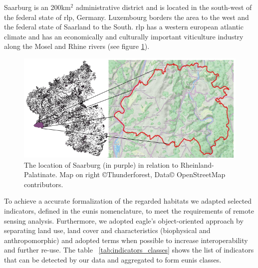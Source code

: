 \documentclass[authoryear,preprint,12pt,number]{elsarticle}
\begin{document}
Saarburg is an 200km$^{2}$ administrative district and is located in the
south-west of the federal state of \gls{rlp}, Germany.
Luxembourg borders the area to the west and the federal state of Saarland to
the South. \gls{rlp} has a western european atlantic climate and has an 
economically
and culturally important viticulture industry along the Mosel and Rhine rivers
(see figure \ref{fig:study_area}).
\begin{figure}
    \includegraphics[width=\textwidth]{diagrams/study_area_closeup.png}
    \caption{The location of Saarburg (in purple) in relation to
    Rheinland-Palatinate. Map on right \copyright Thunderforest, Data\copyright
    OpenStreetMap contributors.}
\label{fig:study_area}
\end{figure}
To achieve a accurate formalization of the regarded habitats we adapted 
selected indicators, defined in the \gls{eunis} nomenclature, to meet the 
requirements of remote sensing analysis. Furthermore, we adopted \gls{eagle}'s 
object-oriented approach by separating land use, land cover and 
characteristics (biophysical and anthropomorphic) and adopted terms when 
possible to increase interoperability and further re-use. The table 
~\ref{tab:indicators_classes} shows the list of indicators that can be detected 
by our data and aggregated to form \gls{eunis} classes. 
\end{document}
